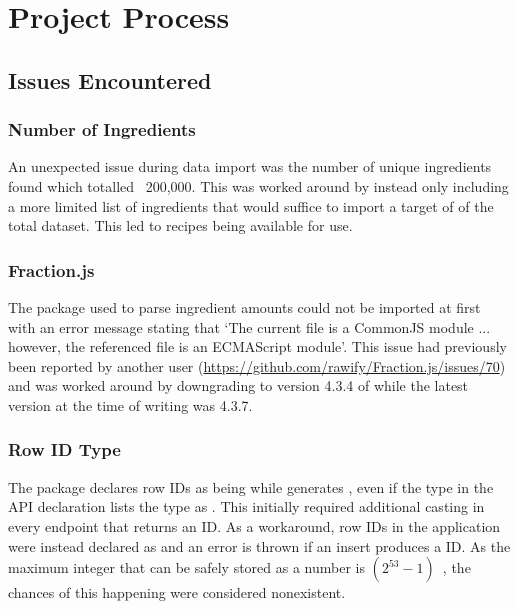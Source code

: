 \section{Project Process}

\subsection{Issues Encountered}

\subsubsection{Number of Ingredients}
An unexpected issue during data import was the number of unique ingredients found which totalled ~200,000. This was worked
around by instead only including a more limited list of ingredients that would suffice to import a target of  of
the total dataset. This led to  recipes being available for use.

\subsubsection{Fraction.js}
The  package used to parse ingredient amounts could not be imported at first with an error message
stating that \enquote*{The current file is a CommonJS module ... however, the referenced file is an ECMAScript module}.
This issue had previously been reported by another user (\href{https://github.com/rawify/Fraction.js/issues/70}{https://github.com/rawify/Fraction.js/issues/70})
and was worked around by downgrading to version 4.3.4 of  while the latest version at the time
of writing was 4.3.7.

\subsubsection{Row ID Type}
The  package declares row IDs as being 
while  generates , even if the type in the API
declaration lists the type as . This initially required additional casting in every endpoint
that returns an ID. As a workaround, row IDs in the application were instead declared as 
and an error is thrown if an insert produces a  ID. As the maximum integer that can be safely stored as a number is
$(2^{53} - 1)$~\cite{noauthor_numbermax_safe_integer_2023}, the chances of this happening were considered nonexistent.

